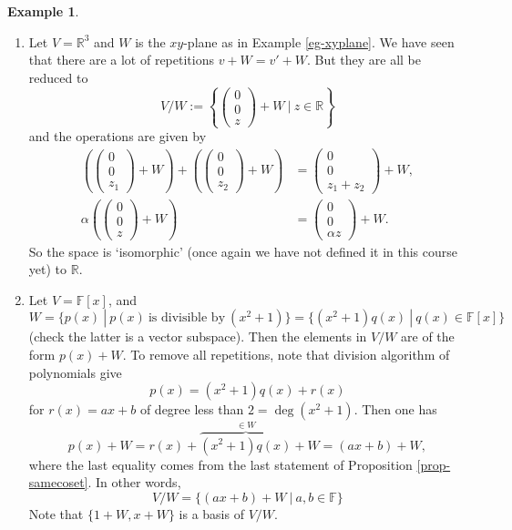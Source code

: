 \documentclass[11pt,openany]{book}
\theoremstyle{plain}
\theoremstyle{definition}
\newtheorem{example}[example]{Example}
\theoremstyle{remark}
\begin{document}
\begin{example} \
\begin{enumerate}
    \item Let $V = \mathbb{R}^3$ and $W$ is the $xy$-plane as in Example \ref{eg-xyplane}. We have seen that there are a lot of repetitions $v + W = v' + W$. But they are all be reduced to
    $$V/W := \left\{ \begin{pmatrix} 0 \\ 0 \\ z \end{pmatrix} + W\ |\ z \in \mathbb{R}\right\}$$
    and the operations are given by 
    \begin{align*} 
    \left(\begin{pmatrix} 0 \\ 0 \\ z_1 \end{pmatrix} + W\right) + \left(\begin{pmatrix} 0 \\ 0 \\ z_2 \end{pmatrix} + W\right) &= \begin{pmatrix} 0 \\ 0 \\ z_1+z_2 \end{pmatrix} + W,\\ \alpha\left(\begin{pmatrix} 0 \\ 0 \\ z \end{pmatrix} + W\right) &= \begin{pmatrix} 0 \\ 0 \\ \alpha z \end{pmatrix} + W.
    \end{align*}
    So the space is `isomorphic' (once again we have not defined it in this course yet) to $\mathbb{R}$.

    \item     Let $V = \mathbb{F}[x]$, and $W = \{p(x)\ |\ p(x)\ \text{is divisible by}\ (x^2+1)\} = \{(x^2+1)q(x)\ |\ q(x) \in \mathbb{F}[x]\}$ (check the latter is a vector subspace). Then the elements in $V/W$ are of the form
    $p(x) + W$. To remove all repetitions, note that division algorithm of polynomials give
    $$p(x) = (x^2+1)q(x) + r(x)$$
    for $r(x) = ax+b$ of degree less than $2 = \deg(x^2+1)$. Then one has
    $$p(x) +W = r(x) + \overbrace{(x^2+1)q(x)}^{\in W} + W = (ax+b) + W,$$
    where the last equality comes from the last statement of Proposition \ref{prop-samecoset}. In other words,
    $$V/W = \{(ax+b) + W\ |\ a, b \in \mathbb{F}\}$$
    Note that $\{1 + W, x + W\}$ is a basis of $V/W$.


\end{enumerate}
\end{example}
\end{document}

